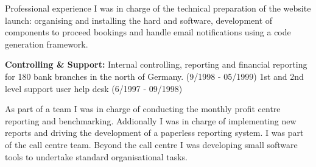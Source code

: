 \begin{rubric}{Professional experience}
I was in charge of the technical preparation of the website launch: organising and installing the hard and software, development of components to proceed bookings and handle email notifications using a code generation framework.

\entry*[06/1997 - 05/1999] \textbf{Controlling \& Support:}\newline
{} 
Internal controlling, reporting and financial reporting for 180 bank branches in the north of Germany. (9/1998 - 05/1999)
1st and 2nd level support user help desk (6/1997 - 09/1998)

As part of a team I was in charge of conducting the monthly profit centre reporting and benchmarking. Addionally I was in charge of implementing new reports and driving the development of a paperless reporting system. 
I was part of the call centre team. Beyond the call centre I was developing small software tools to undertake standard organisational tasks. 

\sloppy
\end{rubric}
